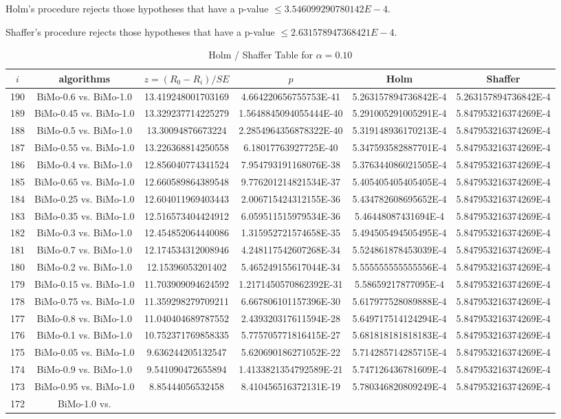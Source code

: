 \documentclass[a4paper,10pt]{article}
\begin{document}
\begin{landscape}
Holm's procedure rejects those hypotheses that have a p-value $\le3.546099290780142E-4$.


Shaffer's procedure rejects those hypotheses that have a p-value $\le2.631578947368421E-4$.


\begin{table}[!htp]
\centering\tiny
\caption{Holm / Shaffer Table for $\alpha=0.10$}
\begin{tabular}{cccccc}
$i$&algorithms&$z=(R_0 - R_i)/SE$&$p$&Holm&Shaffer\\
\hline
190&BiMo-0.6 vs. BiMo-1.0&13.419248001703169&4.664220656755753E-41&5.263157894736842E-4&5.263157894736842E-4\\189&BiMo-0.45 vs. BiMo-1.0&13.329237714225279&1.5648845094055444E-40&5.291005291005291E-4&5.847953216374269E-4\\188&BiMo-0.5 vs. BiMo-1.0&13.30094876673224&2.2854964356878322E-40&5.319148936170213E-4&5.847953216374269E-4\\187&BiMo-0.55 vs. BiMo-1.0&13.226368814250558&6.18017763927725E-40&5.347593582887701E-4&5.847953216374269E-4\\186&BiMo-0.4 vs. BiMo-1.0&12.856040774341524&7.954793191168076E-38&5.376344086021505E-4&5.847953216374269E-4\\185&BiMo-0.65 vs. BiMo-1.0&12.660589864389548&9.776201214821534E-37&5.405405405405405E-4&5.847953216374269E-4\\184&BiMo-0.25 vs. BiMo-1.0&12.604011969403443&2.006715424312155E-36&5.434782608695652E-4&5.847953216374269E-4\\183&BiMo-0.35 vs. BiMo-1.0&12.516573404424912&6.059511515979534E-36&5.46448087431694E-4&5.847953216374269E-4\\182&BiMo-0.3 vs. BiMo-1.0&12.454852064440086&1.315952721574658E-35&5.494505494505495E-4&5.847953216374269E-4\\181&BiMo-0.7 vs. BiMo-1.0&12.174534312008946&4.248117542607268E-34&5.524861878453039E-4&5.847953216374269E-4\\180&BiMo-0.2 vs. BiMo-1.0&12.15396053201402&5.465249155617044E-34&5.555555555555556E-4&5.847953216374269E-4\\179&BiMo-0.15 vs. BiMo-1.0&11.703909094624592&1.2171450570862392E-31&5.58659217877095E-4&5.847953216374269E-4\\178&BiMo-0.75 vs. BiMo-1.0&11.359298279709211&6.667806101157396E-30&5.617977528089888E-4&5.847953216374269E-4\\177&BiMo-0.8 vs. BiMo-1.0&11.040404689787552&2.439320317611594E-28&5.649717514124294E-4&5.847953216374269E-4\\176&BiMo-0.1 vs. BiMo-1.0&10.752371769858335&5.775705771816415E-27&5.681818181818183E-4&5.847953216374269E-4\\175&BiMo-0.05 vs. BiMo-1.0&9.636244205132547&5.620690186271052E-22&5.714285714285715E-4&5.847953216374269E-4\\174&BiMo-0.9 vs. BiMo-1.0&9.541090472655894&1.4133821354792589E-21&5.747126436781609E-4&5.847953216374269E-4\\173&BiMo-0.95 vs. BiMo-1.0&8.85444056532458&8.410456516372131E-19&5.780346820809249E-4&5.847953216374269E-4\\172&BiMo-1.0 vs. 
\end{tabular}
\end{table}
\end{landscape}
\end{document}
